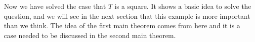 Now we have solved the case that $T$ is a square. It shows a basic 
idea to solve the question, and we will see in the next section 
that this example is more important than we think. The idea of the 
first main theorem comes from here and it is a case needed to be 
discussed in the second main theorem.
